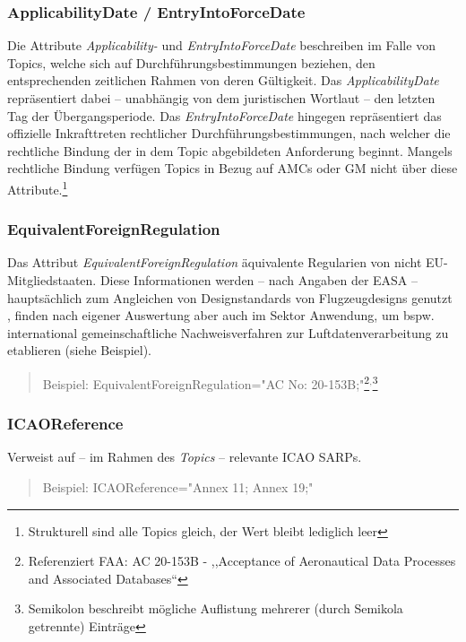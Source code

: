 \subsubsection{ApplicabilityDate / EntryIntoForceDate }

    Die Attribute \textit{Applicability-} und \textit{EntryIntoForceDate} beschreiben im Falle von Topics, welche sich auf Durchführungsbestimmungen beziehen, den entsprechenden zeitlichen Rahmen von deren Gültigkeit.
    Das \textit{ApplicabilityDate} repräsentiert dabei -- unabhängig von dem juristischen Wortlaut -- den letzten Tag der Übergangsperiode. 
    Das \textit{EntryIntoForceDate} hingegen repräsentiert das offizielle Inkrafttreten rechtlicher Durchführungsbestimmungen, nach welcher die rechtliche Bindung der in dem Topic abgebildeten Anforderung beginnt.
    \cite[21]{easa_xml_doc}
    Mangels rechtliche Bindung verfügen Topics in Bezug auf \acsp{AMC} oder \ac{GM} nicht über diese Attribute.\footnote{Strukturell sind alle Topics gleich, der Wert bleibt lediglich leer}
        
\subsubsection{EquivalentForeignRegulation}

    Das Attribut \textit{EquivalentForeignRegulation} äquivalente Regularien von nicht \ac{EU}-Mitgliedstaaten.
    Diese Informationen werden -- nach Angaben der \ac{EASA} -- hauptsächlich zum Angleichen von Designstandards von Flugzeugdesigns genutzt \cite[22]{easa_xml_doc}, finden nach eigener Auswertung aber auch im \atmans{} Sektor Anwendung, um bspw. international gemeinschaftliche Nachweisverfahren zur Luftdatenverarbeitung zu etablieren (siehe Beispiel).
    
    \begin{quote}
        Beispiel:
        \textsf{EquivalentForeignRegulation="{}AC No: 20-153B;"}\footnote{Referenziert \ac{FAA}: \ac{AC} 20-153B - ,,Acceptance of Aeronautical Data Processes and Associated Databases``}$^,$\footnote{Semikolon beschreibt mögliche Auflistung mehrerer (durch Semikola getrennte) Einträge }
    \end{quote}

\subsubsection{ICAOReference}

    Verweist auf -- im Rahmen des \textit{Topics} -- relevante \ac{ICAO} \acp{SARP}. 
    \cite[23]{easa_xml_doc}
    \begin{quote}
        Beispiel:
        \textsf{ICAOReference="{}Annex 11; Annex 19;"}
    \end{quote}
    
